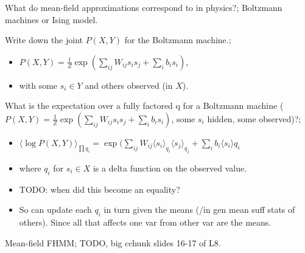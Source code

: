 \documentclass{article}
\begin{document}
What do mean-field approximations correspond to in physics?; Boltzmann machines or Ising model.

Write down the joint $P(X,Y)$ for the Boltzmann machine.; \begin{itemize}
	\item $P(X,Y)=\frac{1}{Z}\exp(\sum_{ij}W_{ij}s_is_j+\sum_ib_is_i)$,
	\item with some $s_i\in Y$ and others observed (in $X$).
\end{itemize}

What is the expectation over a fully factored q for a Boltzmann machine ($P(X,Y)=\frac{1}{Z}\exp(\sum_{ij}W_{ij}s_is_j+\sum_ib_is_i)$, some $s_i$ hidden, some observed)?; \begin{itemize}
	\item $\langle \log P(X,Y)\rangle_{\prod q_i} =\exp(\sum_{ij}W_{ij}\langle s_i\rangle_{q_i}\langle s_j\rangle_{q_j}+\sum_ib_i\langle s_i\rangle q_i$
	\item where $q_i$ for $s_i \in X$ is a delta function on the observed value.
	\item TODO: when did this become an equality?
	\item So can update each $q_i$ in turn given the means (/in gen mean suff stats of others). Since all that affects one var from other var are the means.
\end{itemize}

Mean-field FHMM; TODO, big cchunk slides 16-17 of L8.
\end{document}
